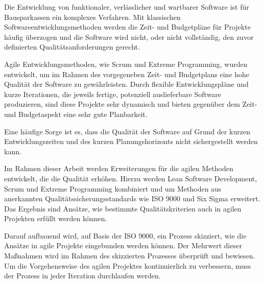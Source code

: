 

    \vspace{\baselineskip}

    Die Entwicklung von funktionaler, verlässlicher und wartbarer Software ist für Bausparkassen ein komplexes Verfahren. Mit klassischen Softwareentwicklungsmethoden werden die Zeit- und Budgetpläne für Projekte häufig überzogen und die Software wird nicht, oder nicht vollständig, den zuvor definierten Qualitätsanforderungen gerecht.

    Agile Entwicklungsmethoden, wie Scrum und Extreme Programming, wurden entwickelt, um im Rahmen des vorgegeneben Zeit- und Budgetplans eine hohe Qualität der Software zu gewährleisten. Durch flexible Entwicklungspläne und kurze Iterationen, die jeweils fertige, potenziell auslieferbare Software produzieren, sind diese Projekte sehr dynamisch und bieten gegenüber dem Zeit- und Budgetaspekt eine sehr gute Planbarkeit.

    Eine häufige Sorge ist es, dass die Qualität der Software auf Grund der kurzen Entwicklungszeiten und des kurzen Planungshorizonts nicht sichergestellt werden kann.

    Im Rahmen dieser Arbeit werden Erweiterungen für die agilen Methoden entwickelt, die die Qualität erhöhen. Hierzu werden Lean Software Development, Scrum und Extreme Programming kombiniert und um Methoden aus anerkannten Qualitätssicherungsstandards wie ISO 9000 und Six Sigma erweitert. Das Ergebnis sind Ansätze, wie bestimmte Qualitätskriterien auch in agilen Projekten erfüllt werden können.

    Darauf aufbauend wird, auf Basis der ISO 9000, ein Prozess skizziert, wie die Ansätze in agile Projekte eingebunden werden können. Der Mehrwert dieser Maßnahmen wird im Rahmen des skizzierten Prozesses überprüft und bewiesen. Um die Vorgehensweise des agilen Projektes kontinuierlich zu verbessern, muss der Prozess in jeder Iteration durchlaufen werden. 
